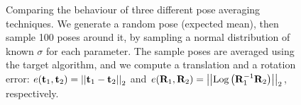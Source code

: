 \newcommand{\tone}{\vecx{t}_1}
\newcommand{\ttwo}{\vecx{t}_2}
\newcommand{\Rone}{\matx{R}_1}
\newcommand{\Rtwo}{\matx{R}_2}
\begin{figure}[h]
	\centering
	\hspace{1pt}
	\caption[Rotation and translation averaging experiment]{Comparing the behaviour of three different pose averaging techniques. We generate a random pose (expected mean), then sample 100 poses around it, by sampling a normal distribution of known $\sigma$ for each parameter.
		The sample poses are averaged using the target algorithm, and we compute a translation and a rotation error:
		$e(\tone, \ttwo) = \normtwo{\tone - \ttwo}$
		and
		$e(\Rone, \Rtwo)=\normtwo{\Logmap{\Rone^{-1}\Rtwo}}$,
		respectively.
	}
	\label{fig:pose-averaging}
\end{figure}


